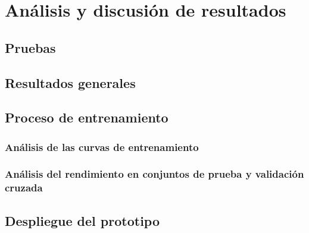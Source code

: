 \chapter{Análisis y discusión de resultados}
\label{ch:resultados}

\section{Pruebas}
\section{Resultados generales}
\section{Proceso de entrenamiento}
    \subsection{Análisis de las curvas de entrenamiento}
    \subsection{Análisis del rendimiento en conjuntos de prueba y validación cruzada}
\section{Despliegue del prototipo}
